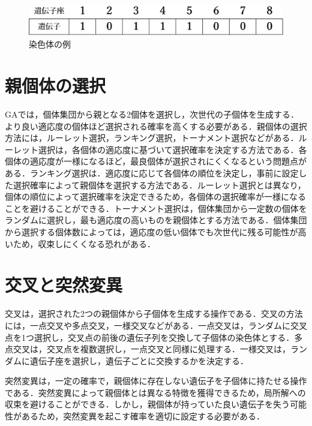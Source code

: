 \begin{figure}[htbp]
\begin{center}
\includegraphics[scale=0.3]{image/GA/03002.eps}
\caption{染色体の例}
\label{03002}
\end{center}
\end{figure}

\section{親個体の選択}
GAでは，個体集団から親となる2個体を選択し，次世代の子個体を生成する．より良い適応度の個体ほど選択される確率を高くする必要がある．親個体の選択方法には，ルーレット選択，ランキング選択，トーナメント選択などがある．ルーレット選択は，各個体の適応度に基づいて選択確率を決定する方法である．各個体の適応度が一様になるほど，最良個体が選択されにくくなるという問題点がある．ランキング選択は．適応度に応じて各個体の順位を決定し，事前に設定した選択確率によって親個体を選択する方法である．ルーレット選択とは異なり，個体の順位によって選択確率を決定できるため，各個体の選択確率が一様になることを避けることができる．トーナメント選択は，個体集団から一定数の個体をランダムに選択し，最も適応度の高いものを親個体とする方法である．個体集団から選択する個体数によっては，適応度の低い個体でも次世代に残る可能性が高いため，収束しにくくなる恐れがある．

\section{交叉と突然変異}
交叉は，選択された2つの親個体から子個体を生成する操作である．交叉の方法には，一点交叉や多点交叉，一様交叉などがある．一点交叉は，ランダムに交叉点を1つ選択し，交叉点の前後の遺伝子列を交換して子個体の染色体とする．多点交叉は，交叉点を複数選択し，一点交叉と同様に処理する．一様交叉は，ランダムに遺伝子座を選択し，遺伝子ごとに交換するかを決定する．

突然変異は，一定の確率で，親個体に存在しない遺伝子を子個体に持たせる操作である．突然変異によって親個体とは異なる特徴を獲得できるため，局所解への収束を避けることができる．しかし，親個体が持っていた良い遺伝子を失う可能性があるため，突然変異を起こす確率を適切に設定する必要がある．